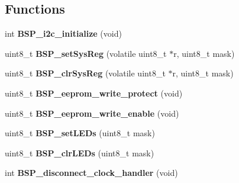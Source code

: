 \subsection*{Functions}
\begin{DoxyCompactItemize}
\item 
\mbox{\label{group__RTEMSBSPsPowerPCMVME3100_gae987223f62f3fe1a0e5b03464e3e4b3e}} 
int {\bfseries B\+S\+P\+\_\+i2c\+\_\+initialize} (void)
\item 
\mbox{\label{group__RTEMSBSPsPowerPCMVME3100_gac132ddeabd0ae81d0507b853c86a5450}} 
uint8\+\_\+t {\bfseries B\+S\+P\+\_\+set\+Sys\+Reg} (volatile uint8\+\_\+t $\ast$r, uint8\+\_\+t mask)
\item 
\mbox{\label{group__RTEMSBSPsPowerPCMVME3100_ga667c898eef41dd6746bed636447fecc2}} 
uint8\+\_\+t {\bfseries B\+S\+P\+\_\+clr\+Sys\+Reg} (volatile uint8\+\_\+t $\ast$r, uint8\+\_\+t mask)
\item 
\mbox{\label{group__RTEMSBSPsPowerPCMVME3100_ga7d573836287a4f93b2947af0e6ee1022}} 
uint8\+\_\+t {\bfseries B\+S\+P\+\_\+eeprom\+\_\+write\+\_\+protect} (void)
\item 
\mbox{\label{group__RTEMSBSPsPowerPCMVME3100_gae95f4b41cc85c5acb18cbfa5813756d1}} 
uint8\+\_\+t {\bfseries B\+S\+P\+\_\+eeprom\+\_\+write\+\_\+enable} (void)
\item 
\mbox{\label{group__RTEMSBSPsPowerPCMVME3100_ga0cf0fc8a087b9a012f11a511365eaa24}} 
uint8\+\_\+t {\bfseries B\+S\+P\+\_\+set\+L\+E\+Ds} (uint8\+\_\+t mask)
\item 
\mbox{\label{group__RTEMSBSPsPowerPCMVME3100_gada286eb2772a89356c2653b57c9c21c2}} 
uint8\+\_\+t {\bfseries B\+S\+P\+\_\+clr\+L\+E\+Ds} (uint8\+\_\+t mask)
\item 
\mbox{\label{group__RTEMSBSPsPowerPCMVME3100_ga5b6f7a1b73b76ef80251fd770905d0c1}} 
int {\bfseries B\+S\+P\+\_\+disconnect\+\_\+clock\+\_\+handler} (void)
\item 

\end{DoxyCompactItemize}
